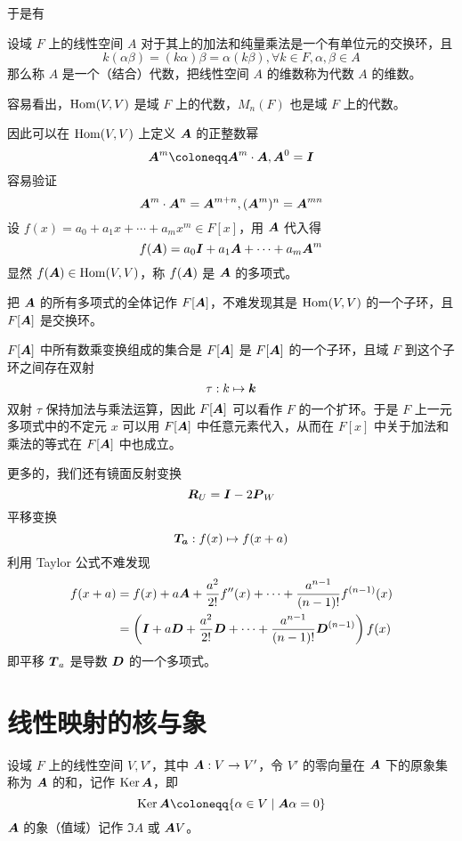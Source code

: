 于是有

\begin{definition}[代数]
	设域 $F$ 上的线性空间 $A$ 对于其上的加法和纯量乘法是一个有单位元的交换环，且
	\[ k(\alpha \beta) = (k\alpha)\beta = \alpha(k\beta), \forall k \in F,\alpha,\beta \in A \]
	那么称 $A$ 是一个（结合）代数，把线性空间 $A$ 的维数称为代数 $A$ 的维数。
\end{definition}

容易看出，$\operatorname{Hom}(V,V)$ 是域 $F$ 上的代数，$M_n(F)$ 也是域 $F$ 上的代数。

因此可以在 $\operatorname{Hom}(V,V)$ 上定义 $\boldsymbol{A}$ 的正整数幂
\[ \vbf{A}^m \coloneqq \vbf{A}^m \cdot \vbf{A}, \vbf{A}^0 = \vbf{I} \]
容易验证
\[ \boldsymbol{A}^m \cdot \boldsymbol{A}^n = \boldsymbol{A}^{m+n}, (\boldsymbol{A}^m)^n = \boldsymbol{A}^{mn} \]
设 $f(x) = a_0 + a_1 x + \cdots + a_mx^m \in F[x]$，用 $\boldsymbol{A}$ 代入得
\[ f(\boldsymbol{A}) = a_0\boldsymbol{I} + a_1\boldsymbol{A} + \cdots + a_m \boldsymbol{A}^m \]
显然 $f(\boldsymbol{A}) \in \operatorname{Hom}(V,V)$，称 $f(\boldsymbol{A})$ 是 $\boldsymbol{A}$ 的多项式。

把 $\boldsymbol{A}$ 的所有多项式的全体记作 $F[\boldsymbol{A}]$，不难发现其是 $\operatorname{Hom}(V,V)$ 的一个子环，且 $F[\boldsymbol{A}]$ 是交换环。

$F[\boldsymbol{A}]$ 中所有数乘变换组成的集合是 $F[\boldsymbol{A}]$ 是 $F[\boldsymbol{A}]$ 的一个子环，且域 $F$ 到这个子环之间存在双射
\[ \tau : k \mapsto \boldsymbol{k} \]
双射 $\tau$ 保持加法与乘法运算，因此 $F[\boldsymbol{A}]$ 可以看作 $F$ 的一个扩环。于是 $F$ 上一元多项式中的不定元 $x$ 可以用 $F[\boldsymbol{A}]$ 中任意元素代入，从而在 $F[x]$ 中关于加法和乘法的等式在 $F[\boldsymbol{A}]$ 中也成立。

更多的，我们还有镜面反射变换
\[ \boldsymbol{R}_U = \boldsymbol{I} - 2\boldsymbol{P}_W \]
平移变换
\[ \boldsymbol{T_a} : f(x) \mapsto f(x+a) \]
利用 Taylor 公式不难发现
\begin{equation*}
	\begin{aligned}
		f(x+a) & = f(x) + a\boldsymbol{A} + \frac{a^2}{2!}f''(x) + \cdots + \frac{a^{n-1}}{(n-1)!} f^{(n-1)}(x)							\\
			   & = \left( \boldsymbol{I} + a\boldsymbol{D} + \frac{a^2}{2!}\boldsymbol{D} + \cdots + \frac{a^{n-1}}{(n-1)!} \boldsymbol{D}^{(n-1)} \right)f(x)
	\end{aligned}
\end{equation*}
即平移 $\boldsymbol{T}_a$ 是导数 $\boldsymbol{D}$ 的一个多项式。

\section{线性映射的核与象}

\begin{definition}[核] 
	设域 $F$ 上的线性空间 $V,V'$，其中 $\boldsymbol{A} : V \to V'$，令 $V'$ 的零向量在 $\boldsymbol{A}$ 下的原象集称为 $\boldsymbol{A}$ 的和，记作 $\operatorname{Ker} \boldsymbol{A}$，即
	\[ \Ker \vbf{A} \coloneqq \{ \alpha \in V \mid \vbf{A}\alpha = 0 \} \]
	$\boldsymbol{A}$ 的象（值域）记作 $\Im A$ 或 $\boldsymbol{A} V$。
\end{definition}

